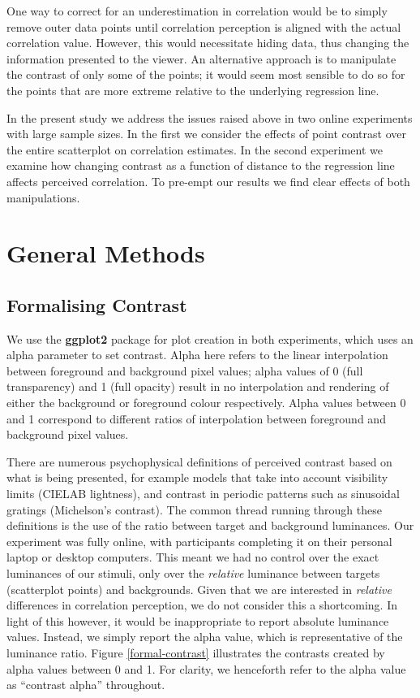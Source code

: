 \documentclass[preprint, 3p,
authoryear]{elsarticle} %
\begin{document}
One way to correct for an underestimation in correlation would be to
simply remove outer data points until correlation perception is aligned
with the actual correlation value. However, this would necessitate
hiding data, thus changing the information presented to the viewer. An
alternative approach is to manipulate the contrast of only some of the
points; it would seem most sensible to do so for the points that are
more extreme relative to the underlying regression line.

In the present study we address the issues raised above in two online
experiments with large sample sizes. In the first we consider the
effects of point contrast over the entire scatterplot on correlation
estimates. In the second experiment we examine how changing contrast as
a function of distance to the regression line affects perceived
correlation. To pre-empt our results we find clear effects of both
manipulations.

\hypertarget{general-methods}{%
\section{General Methods}\label{general-methods}}

\hypertarget{formalising-contrast}{%
\subsection{Formalising Contrast}\label{formalising-contrast}}

We use the \textbf{ggplot2} \citep{hadley_gg2016} package for plot
creation in both experiments, which uses an alpha parameter to set
contrast. Alpha here refers to the linear interpolation
\citep{stone_2008} between foreground and background pixel values; alpha
values of 0 (full transparency) and 1 (full opacity) result in no
interpolation and rendering of either the background or foreground
colour respectively. Alpha values between 0 and 1 correspond to
different ratios of interpolation between foreground and background
pixel values.

There are numerous psychophysical definitions of perceived contrast
\citep{zuffi_2007} based on what is being presented, for example models
that take into account visibility limits (CIELAB lightness), and
contrast in periodic patterns such as sinusoidal gratings (Michelson's
contrast). The common thread running through these definitions is the
use of the ratio between target and background luminances. Our
experiment was fully online, with participants completing it on their
personal laptop or desktop computers. This meant we had no control over
the exact luminances of our stimuli, only over the \emph{relative}
luminance between targets (scatterplot points) and backgrounds. Given
that we are interested in \emph{relative} differences in correlation
perception, we do not consider this a shortcoming. In light of this
however, it would be inappropriate to report absolute luminance values.
Instead, we simply report the alpha value, which is representative of
the luminance ratio. Figure \ref{formal-contrast} illustrates the
contrasts created by alpha values between 0 and 1. For clarity, we
henceforth refer to the alpha value as ``contrast alpha'' throughout.
\end{document}
